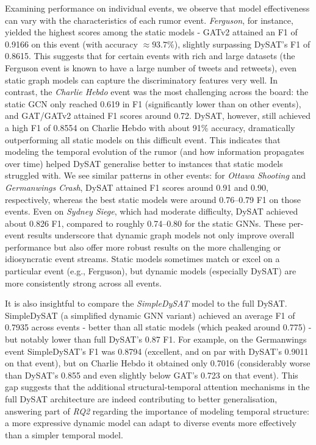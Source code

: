 \documentclass{cshonours}
\begin{document}
Examining performance on individual events, we observe that model effectiveness can vary with the characteristics of each rumor event. \emph{Ferguson}, for instance, yielded the highest scores among the static models - GATv2 attained an F1 of 0.9166 on this event (with accuracy $\approx 93.7\%$), slightly surpassing DySAT's F1 of 0.8615. This suggests that for certain events with rich and large datasets (the Ferguson event is known to have a large number of tweets and retweets), even static graph models can capture the discriminatory features very well. In contrast, the \emph{Charlie Hebdo} event was the most challenging across the board: the static GCN only reached 0.619 in F1 (significantly lower than on other events), and GAT/GATv2 attained F1 scores around 0.72. DySAT, however, still achieved a high F1 of 0.8554 on Charlie Hebdo with about 91\% accuracy, dramatically outperforming all static models on this difficult event. This indicates that modeling the temporal evolution of the rumor (and how information propagates over time) helped DySAT generalise better to instances that static models struggled with. We see similar patterns in other events: for \emph{Ottawa Shooting} and \emph{Germanwings Crash}, DySAT attained F1 scores around 0.91 and 0.90, respectively, whereas the best static models were around 0.76--0.79 F1 on those events. Even on \emph{Sydney Siege}, which had moderate difficulty, DySAT achieved about 0.826 F1, compared to roughly 0.74--0.80 for the static GNNs. These per-event results underscore that dynamic graph models not only improve overall performance but also offer more robust results on the more challenging or idiosyncratic event streams. Static models sometimes match or excel on a particular event (e.g., Ferguson), but dynamic models (especially DySAT) are more consistently strong across all events.



It is also insightful to compare the \textit{SimpleDySAT} model to the full DySAT. SimpleDySAT (a simplified dynamic GNN variant) achieved an average F1 of 0.7935 across events - better than all static models (which peaked around 0.775) - but notably lower than full DySAT's 0.87 F1. For example, on the Germanwings event SimpleDySAT's F1 was 0.8794 (excellent, and on par with DySAT's 0.9011 on that event), but on Charlie Hebdo it obtained only 0.7016 (considerably worse than DySAT's 0.855 and even slightly below GAT's 0.723 on that event). This gap suggests that the additional structural-temporal attention mechanisms in the full DySAT architecture are indeed contributing to better generalisation, answering part of \emph{RQ2} regarding the importance of modeling temporal structure: a more expressive dynamic model can adapt to diverse events more effectively than a simpler temporal model.
\end{document}

